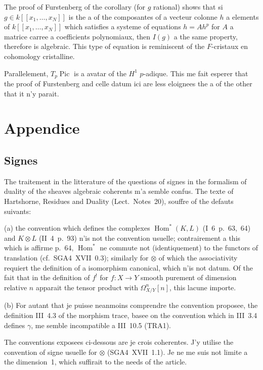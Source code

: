 \documentclass[12pt,a4paper]{article}
\theoremstyle{plain}
\theoremstyle{definition}
\theoremstyle{remark}
\DeclareMathOperator{\Pic}{Pic}
\DeclareMathOperator{\Hom}{Hom}
\providecommand{\Hom}{\operatorname{Hom}}
\begin{document}
The proof of Furstenberg of the corollary (for $g$ rational) shows
that si $g\in k[[x_1,\dots,x_N]]$ is the a of the composantes of a vecteur colonne $h$
a elements of $k[[x_1,\dots,x_N]]$ which satisfies a systeme of equations $h=Ah^p$ for $A$
a matrice carree a coefficients polynomiaux, then $I(g)$ a the same property,
therefore is algebraic. This type of equation is reminiscent of the $F$-cristaux en
cohomology cristalline.

Parallelement, $T_p\Pic$ is a avatar of the $H^1$ $p$-adique. This me fait esperer
that the proof of Furstenberg and celle datum ici are less eloignees
the a of the other that it n'y parait.

\section*{Appendice}

\subsection*{Signes}

The traitement in the litterature of the questions of signes in the formalism
of duality of the sheaves algebraic coherents m'a semble confus. The texte of
Hartshorne, Residues and Duality (Lect.\ Notes~20), souffre of the defauts
suivants:

(a) the convention which defines the complexes $\Hom^*(K,L)$ (I~6~p.~63,~64) and
$K\otimes L$ (II~4~p.~93) n'is not the convention usuelle; contrairement a this which
is affirme p.~64, $\Hom^*$ ne commute not (identiquement) to the functors of
translation (cf.\ SGA4~XVII~0.3); similarly for $\otimes$ of which the associativity requiert
the definition of a isomorphism canonical, which n'is not datum. Of the fait that
in the definition of $f^!$ for $f:X\to Y$ smooth purement of dimension relative $n$
apparait the tensor product with $\Omega^n_{X/Y}[n]$, this lacune importe.

(b) For autant that je puisse neanmoins comprendre the convention proposee,
the definition III~4.3 of the morphism trace, basee on the convention which in
III~3.4 defines $\gamma$, me semble incompatible a III~10.5 (TRA1).

The conventions exposees ci-dessous are je crois coherentes. J'y utilise the
convention of signe usuelle for $\otimes$ (SGA4~XVII~1.1). Je ne me suis not limite
a the dimension~1, which suffirait to the needs of the article.
\end{document}
